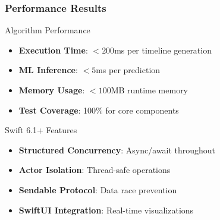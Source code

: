 \documentclass[aspectratio=169]{beamer}
\begin{document}
\begin{frame}
    \frametitle{Performance Results}
    \begin{block}{Algorithm Performance}
        \begin{itemize}
            \item \textbf{Execution Time}: $< 200$ms per timeline generation
            \item \textbf{ML Inference}: $< 5$ms per prediction
            \item \textbf{Memory Usage}: $< 100$MB runtime memory
            \item \textbf{Test Coverage}: 100\% for core components
        \end{itemize}
    \end{block}
    
    \begin{block}{Swift 6.1+ Features}
        \begin{itemize}
            \item \textbf{Structured Concurrency}: Async/await throughout
            \item \textbf{Actor Isolation}: Thread-safe operations
            \item \textbf{Sendable Protocol}: Data race prevention
            \item \textbf{SwiftUI Integration}: Real-time visualizations
        \end{itemize}
    \end{block}
\end{frame}
\end{document}

